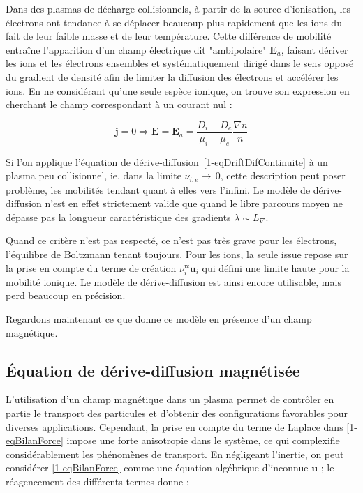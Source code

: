 \begin{refsection}
Dans des plasmas de décharge collisionnels, à partir de la source d'ionisation,
les électrons ont tendance à se déplacer beaucoup plus rapidement que les ions
du fait de leur faible masse et de leur température. Cette différence de
mobilité entraîne l'apparition d'un champ électrique dit "ambipolaire"
$\mathbf E_a$, faisant dériver les ions et les électrons ensembles et
systématiquement dirigé dans le sens opposé du gradient de densité afin de
limiter la diffusion des électrons et accélérer les ions. En ne considérant
qu'une seule espèce ionique, on trouve son expression en cherchant le champ
correspondant à un courant nul :
 
\begin{equation}
\label{1-eqEAmb}
\mathbf j=0 \Rightarrow \mathbf E=\mathbf
E_a=\frac{D_i-D_e}{\mu_i+\mu_e}\frac{\nabla
n}{n}
\end{equation}

Si l'on applique l'équation de
dérive-diffusion~\eqref{1-eqDriftDifContinuite} à un plasma peu collisionnel,
ie. dans la limite $\nu_{i,e}\rightarrow\,$0, cette description peut poser
problème, les mobilités tendant quant à elles vers l'infini. Le modèle de
dérive-diffusion n'est en effet strictement valide que quand le libre parcours
moyen ne dépasse pas la longueur caractéristique des gradients $\lambda\sim L_{\nabla}$. 

Quand ce critère n'est pas respecté, ce n'est pas très grave pour les
électrons, l'équilibre de
Boltzmann tenant toujours.
Pour les ions, la seule issue repose sur la prise en compte du
terme de création $\nu^\text{iz}_i\mathbf u_i$ qui défini une limite haute pour
la mobilité ionique.
Le modèle de dérive-diffusion est ainsi encore utilisable, mais perd beaucoup en
précision.

Regardons maintenant ce que donne ce modèle en présence d'un champ magnétique.

\subsection{Équation de dérive-diffusion magnétisée}
\label{1-deriveDiffMag}
L'utilisation d'un champ magnétique dans un plasma permet de contrôler en partie
le transport des particules et d'obtenir des configurations favorables pour
diverses applications. Cependant, la prise en compte du terme de Laplace dans
\eqref{1-eqBilanForce} impose une forte anisotropie dans le système, ce qui
complexifie considérablement les phénomènes de transport. En
négligeant l'inertie, on peut considérer \eqref{1-eqBilanForce} comme une
équation algébrique d'inconnue $\mathbf u$ ; le réagencement des différents
termes donne :


\end{refsection}
